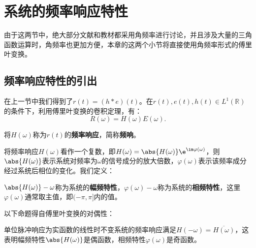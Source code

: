 \section{系统的频率响应特性}\label{sec:Freq_Response}

由于这两节中，绝大部分文献和教材都采用角频率进行讨论，并且涉及大量的三角函数运算时，角频率也更加方便，本章的这两个小节将直接使用角频率形式的傅里叶变换。

\subsection{频率响应特性的引出}\label{sub:freq_response}
在上一节中我们得到了$r(t)=(h*e)(t)$。在$r(t),e(t),h(t)\in L^1(\mathbb{R})$的条件下，利用傅里叶变换的卷积定理，有：
\begin{equation}
    R(\omega)=H(\omega)E(\omega).
\end{equation}
\begin{definition}[频率响应]
    将$H(\omega)$称为$r(t)$的\textbf{频率响应}，简称\textbf{频响}。
\end{definition}

将频率响应$H(\omega)$看作一个复数，即$H(\omega)=\abs{H(\omega)}\e^{\im\varphi(\omega)}$，则$\abs{H(\omega)}$表示系统对频率为$\omega$的信号成分的放大倍数，$\varphi(\omega)$表示该频率成分经过系统后相位的变化。我们定义：
\begin{definition}[幅频特性和相频特性]
    $\abs{H(\omega)}-\omega$称为系统的\textbf{幅频特性}，$\varphi(\omega)-\omega$称为系统的\textbf{相频特性}，这里$\varphi(\omega)$通常取主值，即$(-\pi,\pi]$内的值。
\end{definition}

以下命题得自傅里叶变换的对偶性：
\begin{proposition}
    单位脉冲响应为实函数的线性时不变系统的频率响应满足$H(-\omega)=\overline{H(\omega)}$，这表明幅频特性$\abs{H(\omega)}$是偶函数，相频特性$\varphi(\omega)$是奇函数。
\end{proposition}

